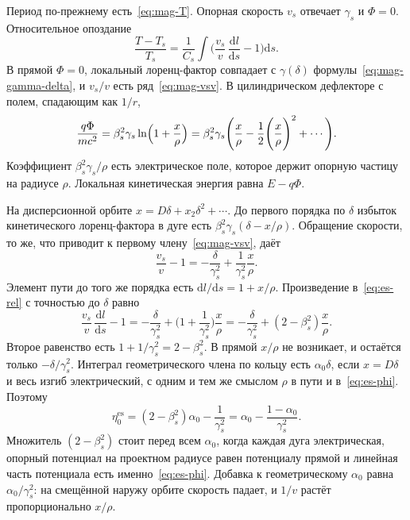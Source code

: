 Период по-прежнему есть~\eqref{eq:mag-T}. Опорная скорость $v_s$ отвечает $\gamma_s$ и $\Phi=0$. Относительное опоздание
\begin{equation}
\label{eq:es-rel}
\frac{T-T_s}{T_s}
=\frac{1}{C_s}\int\Biggl(\frac{v_s}{v}\,\frac{\mathrm{d}l}{\mathrm{d}s}-1\Biggr)\mathrm{d}s.
\end{equation}
В прямой $\Phi=0$, локальный лоренц-фактор совпадает с $\gamma(\delta)$ формулы~\eqref{eq:mag-gamma-delta}, и $v_s/v$ есть ряд~\eqref{eq:mag-vsv}. В цилиндрическом дефлекторе с полем, спадающим как $1/r$,
\begin{equation}
\label{eq:es-phi}
\frac{q\Phi}{mc^2}
=\beta_s^2\gamma_s\ln\Bigl(1+\frac{x}{\rho}\Bigr)
=\beta_s^2\gamma_s\Biggl(\frac{x}{\rho}-\frac{1}{2}\Biggl(\frac{x}{\rho}\Biggr)^2+\cdots\Biggr).
\end{equation}
Коэффициент $\beta_s^2\gamma_s/\rho$ есть электрическое поле, которое держит опорную частицу на радиусе $\rho$. Локальная кинетическая энергия равна $E-q\Phi$.

На дисперсионной орбите $x=D\delta+x_2\delta^2+\cdots$. До первого порядка по $\delta$ избыток кинетического лоренц-фактора в дуге есть $\beta_s^2\gamma_s(\delta-x/\rho)$. Обращение скорости, то же, что приводит к первому члену~\eqref{eq:mag-vsv}, даёт
\begin{equation}
\label{eq:es-v-linear}
\frac{v_s}{v}-1
=-\frac{\delta}{\gamma_s^2}+\frac{1}{\gamma_s^2}\frac{x}{\rho}.
\end{equation}
Элемент пути до того же порядка есть $\mathrm{d}l/\mathrm{d}s=1+x/\rho$. Произведение в~\eqref{eq:es-rel} с точностью до $\delta$ равно
\begin{equation}
\label{eq:es-integrand}
\frac{v_s}{v}\,\frac{\mathrm{d}l}{\mathrm{d}s}-1
=-\frac{\delta}{\gamma_s^2}
+\Biggl(1+\frac{1}{\gamma_s^2}\Biggr)\frac{x}{\rho}
=-\frac{\delta}{\gamma_s^2}
+(2-\beta_s^2)\frac{x}{\rho}.
\end{equation}
Второе равенство есть $1+1/\gamma_s^2=2-\beta_s^2$. В прямой $x/\rho$ не возникает, и остаётся только $-\delta/\gamma_s^2$. Интеграл геометрического члена по кольцу есть $\alpha_0\delta$, если $x=D\delta$ и весь изгиб электрический, с одним и тем же смыслом $\rho$ в пути и в~\eqref{eq:es-phi}. Поэтому
\begin{equation}
\label{eq:es-eta0}
\eta_0^{\mathrm{es}}
=(2-\beta_s^2)\alpha_0-\frac{1}{\gamma_s^2}
=\alpha_0-\frac{1-\alpha_0}{\gamma_s^2}.
\end{equation}
Множитель $(2-\beta_s^2)$ стоит перед всем $\alpha_0$, когда каждая дуга электрическая, опорный потенциал на проектном радиусе равен потенциалу прямой и линейная часть потенциала есть именно~\eqref{eq:es-phi}. Добавка к геометрическому $\alpha_0$ равна $\alpha_0/\gamma_s^2$: на смещённой наружу орбите скорость падает, и $1/v$ растёт пропорционально $x/\rho$.

